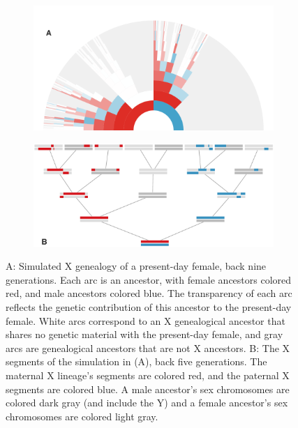 \documentclass[11pt]{article}
\begin{document}
\begin{figure}[!ht]
    \centering
    \begin{subfigure}[b]{0.8\textwidth}
      \includegraphics[width=\textwidth]{images/x-arc}
    \end{subfigure}
    \begin{subfigure}[b]{0.8\textwidth}
      \includegraphics[width=\textwidth]{images/x-tree}
    \end{subfigure}
    
    \caption{A: Simulated X genealogy of a present-day female, back nine
      generations.  Each arc is an ancestor, with female ancestors colored red,
      and male ancestors colored blue. The transparency of each arc reflects
      the genetic contribution of this ancestor to the present-day female.
      White arcs correspond to an X genealogical ancestor that shares no
      genetic material with the present-day female, and gray arcs are
      genealogical ancestors that are not X ancestors. B: The X segments of the
      simulation in (A), back five generations.  The maternal X lineage's
      segments are colored red, and the paternal X segments are colored blue. A
      male ancestor's sex chromosomes are colored dark gray (and include the Y)
    and a female ancestor's sex chromosomes are colored light gray.}

    \label{fig:x-arc}

  \end{figure}
\end{document}
